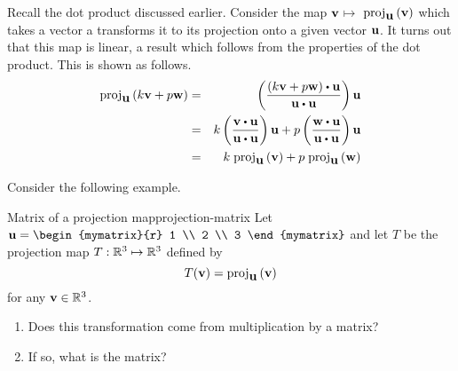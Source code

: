 Recall the dot product discussed earlier. Consider the map $\mbox{\bf v}$\textbf{$\mapsto $}
$\mbox{\rm proj}_{\mbox{\bf u}}\left(\mbox{\bf v}\right) $ which takes a vector a transforms it to its projection onto a given vector $\mbox{\bf u}$. It turns out that
this map is linear, a result which follows from the properties of the
dot product. This is shown as follows.
\begin{eqnarray*}
\func{proj}_{\vect{u}}\tup{k \vect{v}+ p \vect{w}}
&=&\tup{\vspace{0.05in}\frac{(k \vect{v}+ p \vect{w})\dotprod \vect{u}}{
\vect{u}\dotprod \vect{u}}} \vect{u} \\
&=& k  \tup{\vspace{0.05in}\frac{
\vect{v}\dotprod \vect{u}}{\vect{u}\dotprod \vect{u}}} \vect{u}+p \tup{\vspace{
0.05in}\frac{\vect{w}\dotprod \vect{u}}{\vect{u}\dotprod \vect{u}}} \vect{u} \\
&=& k \; \func{proj}_{\vect{u}}\tup{\vect{v}} +p \; \func{proj}
_{\vect{u}}\tup{\vect{w}} 
\end{eqnarray*}

Consider the following example.

\begin{example}{Matrix of a projection map}{projection-matrix}
Let $\vect{u} = \begin{mymatrix}{r}
1 \\
2 \\
3
\end{mymatrix}$ and let $T$ be the projection map $T: \mathbb{R}^3 \mapsto \mathbb{R}^3$ defined by 
\[
T(\mbox{\bf v}) = \mbox{\rm proj}_{\mbox{\bf u}}\left(\mbox{\bf v}\right)
\]
for any $\mbox{\bf v} \in \mathbb{R}^3$.  
\begin{enumerate}
\item Does this transformation come from
multiplication by a matrix?
\item If so, what is the matrix?
\end{enumerate}
\end{example}


